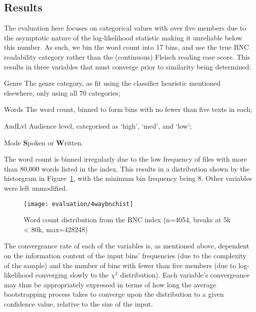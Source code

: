 \subsection{Results}

The evaluation here focuses on categorical values with over five members due to the asymptotic nature of the log-likelihood statistic making it unreliable below this number.  As such, we bin the word count into 17 bins, and use the true BNC readability category rather than the (continuous) Fleisch reading ease score.  This results in three variables that must converge prior to similarity being determined:

\begin{itemizeTitle}
    \item[Genre]  The genre category, as fit using the classifier heuristic mentioned elsewhere, only using all 70 categories;
    \item[Words]  The word count, binned to form bins with no fewer than five texts in each;
    \item[AudLvl] Audience level, categorised as `high', `med', and `low';
    \item[Mode]   \textbf{S}poken or \textbf{W}ritten.
\end{itemizeTitle}

The word count is binned irregularly due to the low frequency of files with more than 80,000 words listed in the index.  This results in a distribution shown by the historgram in Figure~\ref{fig:evaluation:resampling:bncwordhist}, with the minimum bin frequency being 8.  Other variables were left unmodified.


\begin{figure}[Ht]
    \centering
    \texttt{[image: evaluation/4waybnchist]}
    \caption{Word count distribution from the BNC index (n=4054, breaks at 5k < 80k, max=428248)}
    \label{fig:evaluation:resampling:bncwordhist}
\end{figure}


The convergeance rate of each of the variables is, as mentioned above, dependent on the information content of the input bins' frequencies (due to the complexity of the sample) and the number of bins with fewer than five members (due to log-likelihood converging slowly to the $\chi^2$ distribution).  Each variable's convergeance may thus be appropriately expressed in terms of how long the average bootstrapping process takes to converge upon the distribution to a given confidence value, relative to the size of the input.

